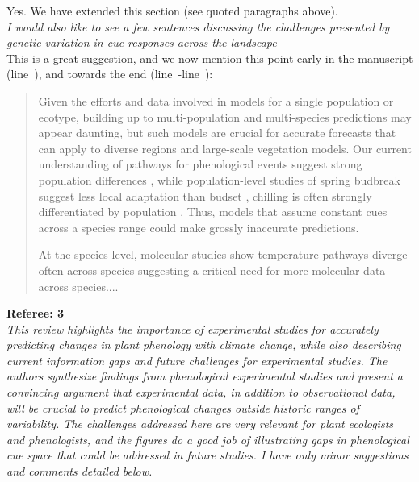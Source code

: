 \documentclass[11pt,letter]{article}
\newcommand{\lr}[1]{line~\lineref{#1}}
\begin{document}
Yes. We have extended this section (see quoted paragraphs above).\\

\emph{I would also like to see a few sentences discussing the challenges presented by genetic variation in cue responses across the landscape }\\

This is a great suggestion, and we now mention this point early in the manuscript (\lr{molecpop}), and towards the end (\lr{r2popstart}-\lr{r2popsend}):
\begin{quote}
Given the efforts and data involved in models for a single population or ecotype, building up to multi-population and multi-species predictions may appear daunting, but such models are crucial for accurate forecasts that can apply to diverse regions and large-scale vegetation models. Our current understanding of pathways for phenological events suggest strong population differences \citep{Wilczek:2009oa,Tanino2010}, while population-level studies of spring budbreak suggest less local adaptation than budset \citep{Aitken:2008}, chilling is often strongly differentiated by population \citep{Junttila:2012aa}. Thus, models that assume constant cues across a species range could make grossly inaccurate predictions.

At the species-level, molecular studies show temperature pathways diverge often across species \citep[on contrast, photoperiodic control appears highly conserved,][]{Satake2022} suggesting a critical need for more molecular data across species....
\end{quote}

{\bf Referee: 3}\\

\emph{This review highlights the importance of experimental studies for accurately predicting changes in plant phenology with climate change, while also describing current information gaps and future challenges for experimental studies.  The authors synthesize findings from phenological experimental studies and present a convincing argument that experimental data, in addition to observational data, will be crucial to predict phenological changes outside historic ranges of variability. The challenges addressed here are very relevant for plant ecologists and phenologists, and the figures do a good job of illustrating gaps in phenological cue space that could be addressed in future studies. I have only minor suggestions and comments detailed below. }\\
\end{document}
